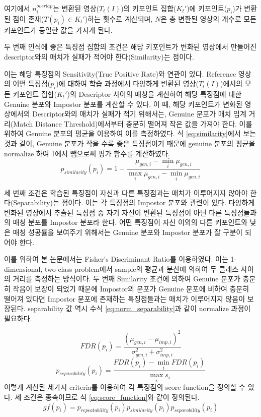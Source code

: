 여기에서 $n_i^{overlap}$는 변환된 영상($T_t(I)$)의 키포인트 집합($K_t'$)에 키포인트($p_i$)가 변환된 점이 존재($T(p_i)\in K_t'$)하는 횟수로 계산되며, $N$은 총 변환된 영상의 개수로 모든 키포인트가 동일한 값을 가지게 된다.

두 번째 인식에 좋은 특징점 집합의 조건은 해당 키포인트가 변화된 영상에서 만들어진 descriptor와의 매치가 실패가 적어야 한다(Similarity)는 점이다.

이는 해당 특징점의 Sensitivity(True Positive Rate)와 연관이 있다. Reference 영상의 어떤 특징점($p_i$)에 대하여 학습 과정에서 다양하게 변환된 영상($T_t(I)$)에서의 모든 키포인트 집합($K_t'$)의 Descriptor 사이의 매칭을 계산하여 해당 특징점에 대한 Genuine 분포와 Impostor 분포를 계산할 수 있다. 이 때, 해당 키포인트가 변화된 영상에서의 Descriptor와의 매치가 실패가 적기 위해서는, Genuine 분포가 매치 임계 거리(Match Distance Threshold)에서부터 충분히 떨어져 작은 값을 가져야 한다. 이를 위하여 Genuine 분포의 평균을 이용하여 이를 측정하였다. 식 \ref{eq:similarity}에서 보는 것과 같이, Genuine 분포가 작을 수록 좋은 특징점이기 때문에 genuine 분포의 평균을 normalize 하여 1에서 뺌으로써 평가 함수를 계산하였다.
\begin{equation}
p_{similarity}(p_i) = 1 - \frac{\mu_{gen,i} - \min_i \mu_{gen,i}}{\max_i \mu_{gen, i} - \min_i \mu_{gen,i}}
\end{equation}	\label{eq:similarity}

세 번째 조건은 학습된 특징점이 자신과 다른 특징점과는 매치가 이루어지지 않아야 한다(Separability)는 점이다. 이는 각 특징점의 Impostor 분포와 관련이 있다. 다양하게 변화된 영상에서 추출된 특징점 중 자기 자신이 변환된 특징점이 아닌 다른 특징점들과의 매칭 분포를 Impostor 분포라 한다. 어떤 특징점이 자신 이외의 다른 키포인트와 낮은 매칭 성공률을 보여주기 위해서는 Genuine 분포와 Impostor 분포가 잘 구분이 되어야 한다.

이를 위하여 본 논문에서는 Fisher's Discriminant Ratio\cite{fisher_use_1936}를 이용하였다. 이는 1-dimensional, two class problem에서 sample의 평균과 분산에 의하여 두 클래스 사이의 거리를 측정하는 방식이다. 두 번째 Similarity 조건에 의하여 Genuine 분포가 충분히 작음이 보장이 되었기 때문에 Impostor의 분포가 Genuine 분포에 비하여 충분히 떨어져 있다면 Impostor 분포에 존재하는 특징점들과는 매치가 이루어지지 않음이 보장된다. separability 값 역시 수식 \ref{eq:norm_separability}과 같이 normalize 과정이 필요하다.

\begin{equation}
FDR(p_i) = \frac{(\mu_{gen,i} - \mu_{imp, i})^2}{\sigma_{gen, i}^2 + \sigma_{imp, i}^2}
\end{equation}
\begin{equation}
p_{separability}(p_i) = \frac{FDR(p_i) - \min_i {FDR(p_i)}}{\max_{i} {s_i}}
\end{equation}	\label{eq:norm_separability}
이렇게 계산된 세가지 criteria를 이용하여 각 특징점의 score function을 정의할 수 있다. 세 조건은 종속이므로 식 \ref{eq:score_function}와 같이 정의된다.
\begin{equation}
gf(p_i) = p_{repeatability}(p_i)p_{similarity}(p_i)p_{separability}(p_i)
\end{equation} \label{eq:score_function}




